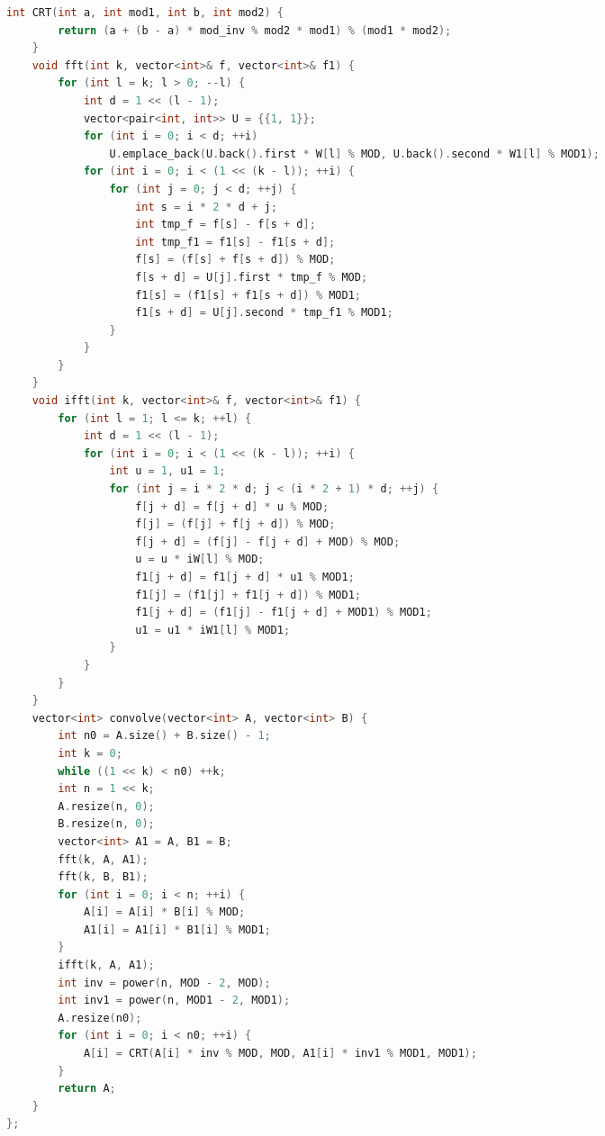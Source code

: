 \documentclass[10pt,landscape, a4paper]{article}
\begin{document}
\begin{multicols*}{3}
\begin{lstlisting}[language=C++]
    int CRT(int a, int mod1, int b, int mod2) {
        return (a + (b - a) * mod_inv % mod2 * mod1) % (mod1 * mod2);
    }
    void fft(int k, vector<int>& f, vector<int>& f1) {
        for (int l = k; l > 0; --l) {
            int d = 1 << (l - 1);
            vector<pair<int, int>> U = {{1, 1}};
            for (int i = 0; i < d; ++i)
                U.emplace_back(U.back().first * W[l] % MOD, U.back().second * W1[l] % MOD1);
            for (int i = 0; i < (1 << (k - l)); ++i) {
                for (int j = 0; j < d; ++j) {
                    int s = i * 2 * d + j;
                    int tmp_f = f[s] - f[s + d];
                    int tmp_f1 = f1[s] - f1[s + d];
                    f[s] = (f[s] + f[s + d]) % MOD;
                    f[s + d] = U[j].first * tmp_f % MOD;
                    f1[s] = (f1[s] + f1[s + d]) % MOD1;
                    f1[s + d] = U[j].second * tmp_f1 % MOD1;
                }
            }
        }
    }
    void ifft(int k, vector<int>& f, vector<int>& f1) {
        for (int l = 1; l <= k; ++l) {
            int d = 1 << (l - 1);
            for (int i = 0; i < (1 << (k - l)); ++i) {
                int u = 1, u1 = 1;
                for (int j = i * 2 * d; j < (i * 2 + 1) * d; ++j) {
                    f[j + d] = f[j + d] * u % MOD;
                    f[j] = (f[j] + f[j + d]) % MOD;
                    f[j + d] = (f[j] - f[j + d] + MOD) % MOD;
                    u = u * iW[l] % MOD;
                    f1[j + d] = f1[j + d] * u1 % MOD1;
                    f1[j] = (f1[j] + f1[j + d]) % MOD1;
                    f1[j + d] = (f1[j] - f1[j + d] + MOD1) % MOD1;
                    u1 = u1 * iW1[l] % MOD1;
                }
            }
        }
    }
    vector<int> convolve(vector<int> A, vector<int> B) {
        int n0 = A.size() + B.size() - 1;
        int k = 0;
        while ((1 << k) < n0) ++k;
        int n = 1 << k;
        A.resize(n, 0);
        B.resize(n, 0);
        vector<int> A1 = A, B1 = B;
        fft(k, A, A1);
        fft(k, B, B1);
        for (int i = 0; i < n; ++i) {
            A[i] = A[i] * B[i] % MOD;
            A1[i] = A1[i] * B1[i] % MOD1;
        }
        ifft(k, A, A1);
        int inv = power(n, MOD - 2, MOD);
        int inv1 = power(n, MOD1 - 2, MOD1);
        A.resize(n0);
        for (int i = 0; i < n0; ++i) {
            A[i] = CRT(A[i] * inv % MOD, MOD, A1[i] * inv1 % MOD1, MOD1);
        }
        return A;
    }
};
\end{lstlisting}


\end{multicols*}
\end{document}
